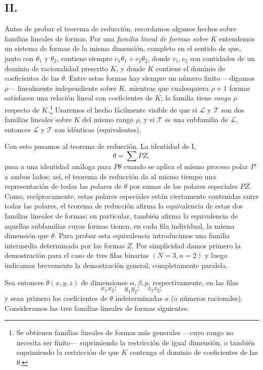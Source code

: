 \documentclass[11pt]{article}
\begin{document}
\subsection*{II.}
Antes de probar el teorema de reducción, recordamos algunos hechos sobre familias lineales de formas. Por una \emph{familia lineal de formas sobre $K$} entendemos un sistema de formas de la misma dimensión, completo en el sentido de que, junto con $\theta_1$ y $\theta_2$, contiene siempre $c_1\theta_1+c_2\theta_2$, donde $c_1,c_2$ son cantidades de un dominio de racionalidad prescrito $K$, y donde $K$ contiene el dominio de coeficientes de las $\theta$. Entre estas formas hay siempre un número finito ---digamos $\rho$--- linealmente independiente sobre $K$, mientras que cualesquiera $\rho+1$ formas satisfacen una relación lineal con coeficientes de $K$; la familia tiene \emph{rango $\rho$} respecto de $K$.\footnote{Se obtienen familias lineales de formas más generales ---cuyo rango no necesita ser finito--- suprimiendo la restricción de igual dimensión, o también suprimiendo la restricción de que $K$ contenga el dominio de coeficientes de las $\theta$.} Usaremos el hecho fácilmente visible de que si $\mathcal L$ y $\mathcal T$ son dos familias lineales sobre $K$ del mismo rango $\rho$, y si $\mathcal T$ es una subfamilia de $\mathcal L$, entonces $\mathcal L$ y $\mathcal T$ son idénticas (equivalentes).

Con esto pasamos al teorema de reducción. La identidad de I,
\[
  \theta=\sum PZ,
\]
pasa a una identidad análoga para $P\theta$ cuando se aplica el mismo proceso polar $P$ a ambos lados; así, el teorema de reducción da al mismo tiempo una representación de todas las polares de $\theta$ por sumas de las polares especiales $PZ$. Como, recíprocamente, estas polares especiales están ciertamente contenidas entre todas las polares, el teorema de reducción afirma la equivalencia de estas dos familias lineales de formas; en particular, también afirma la equivalencia de aquellas subfamilias cuyas formas tienen, en cada fila individual, la misma dimensión que $\theta$. Para probar esta equivalencia introducimos una familia intermedia determinada por las formas $Z$. Por simplicidad damos primero la demostración para el caso de tres filas binarias $(N=3,n=2)$ y luego indicamos brevemente la demostración general, completamente paralela.

Sea entonces $\theta(x,y,z)$ de dimensiones $\alpha,\beta,p$, respectivamente, en las filas
\[
  x_1x_2;\quad y_1y_2;\quad z_1z_2;
\]
y sean primero los coeficientes de $\theta$ indeterminadas $a$ (o números racionales). Consideramos las tres familias lineales de formas siguientes.
\end{document}
